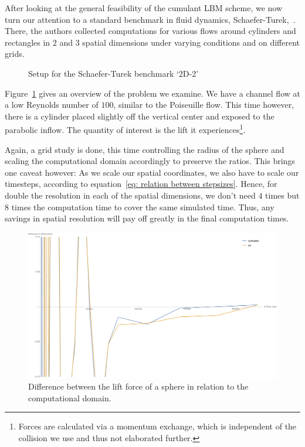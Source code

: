 After looking at the general feasibility of the cumulant LBM scheme, we now turn our attention to a standard benchmark in fluid dynamics, Schaefer-Turek,~\cite{schafer1996benchmark}.
There, the authors collected computations for various flows around cylinders and rectangles in $2$ and $3$ spatial dimensions under varying conditions and on different grids.

\begin{figure}
  \centering
  
  \caption{Setup for the Schaefer-Turek benchmark `2D-2'}
\label{fig: schaeferTurek}
\end{figure}

Figure~\ref{fig: schaeferTurek} gives an overview of the problem we examine.
We have a channel flow at a low Reynolds number of $100$, similar to the Poiseuille flow.
This time however, there is a cylinder placed slightly off the vertical center and exposed to the parabolic inflow.
The quantity of interest is the lift it experiences\footnote{Forces are calculated via a momentum exchange, which is independent of the collision we use and thus not elaborated further.}.

Again, a grid study is done, this time controlling the radius of the sphere and scaling the computational domain accordingly to preserve the ratios.
This brings one caveat however:
As we scale our spatial coordinates, we also have to scale our timesteps, according to equation~\eqref{eq: relation between stepsizes}.
Hence, for double the resolution in each of the spatial dimensions, we don't need $4$ times but $8$ times the computation time to cover the same simulated time.
Thus, any savings in spatial resolution will pay off greatly in the final computation times.


\begin{figure}
  \centering
  \includegraphics[width=\linewidth]{../figures/schaeferTurekLift_nrFluidVsDiff.pdf} %
  \caption{Difference between the lift force of a sphere in relation to the computational domain.}
\label{fig: schaefer turek nrFluidVsDiff}
\end{figure}

